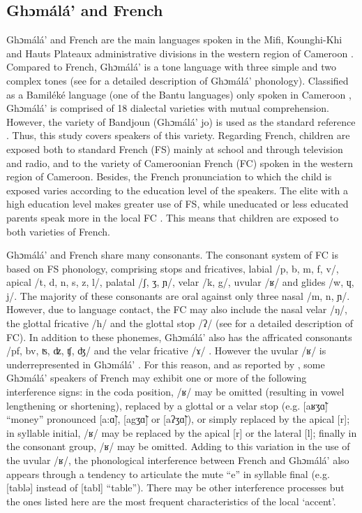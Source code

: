 \documentclass[output=paper,newtxmath,modfonts,nonflat,draftmode]{langsci/langscibook}
\begin{document}
\subsection{Ghɔmálá’ and French} %

Ghɔmálá’ and French are the main languages spoken in the Mifi, Kounghi-Khi and Hauts Plateaux administrative divisions in the western region of Cameroon \citep{Breton1991}. Compared to French, Ghɔmálá’ is a tone language with three simple and two complex tones (see \citet{Nissim1981} for a detailed description of Ghɔmálá’ phonology). Classified as a Bamiléké language (one of the Bantu languages) only spoken in Cameroon \citep{Dieu1983}, Ghɔmálá’ is comprised of 18 dialectal varieties with mutual comprehension. However, the variety of Bandjoun (Ghɔmálá’ jo) is used as the standard reference \citep{Domche1991}. Thus, this study covers speakers of this variety. Regarding French, children are exposed both to standard French (FS) mainly at school and through television and radio, and to the variety of Cameroonian French (FC) spoken in the western region of Cameroon. Besides, the French pronunciation to which the child is exposed varies according to the education level of the speakers. The elite with a high education level makes greater use of FS, while uneducated or less educated parents speak more in the local FC \citep{Biloa2004}. This means that children are exposed to both varieties of French. 

Ghɔmálá’ and French share many consonants. The consonant system of FC is based on FS phonology, comprising stops and fricatives, labial /p, b, m, f, v/, apical /t, d, n, s, z, l/, palatal /ʃ, ʒ, ɲ/, velar /k, g/, uvular /ʁ/ and glides /w, ɥ, j/. The majority of these consonants are oral against only three nasal /m, n, ɲ/. However, due to language contact, the FC may also include the nasal velar /ŋ/, the glottal fricative /h/ and the glottal stop /ʔ/ (see \citet{Biloa2004} for a detailed description of FC). In addition to these phonemes, Ghɔmálá’ also has the affricated consonants /pf, bv, ʦ, ʣ, ʧ, ʤ/ and the velar fricative /ɤ/ \citep{Mba1995}. However the uvular /ʁ/ is underrepresented in Ghɔmálá’ \citep{Mba1995}. For this reason, and as reported by \citet{Biloa2004}, some Ghɔmálá’ speakers of French may exhibit one or more of the following interference signs: in the coda position, /ʁ/ may be omitted (resulting in vowel lengthening or shortening), replaced by a glottal or a velar stop (e.g. [aʁʒɑ̃] “money” pronounced [a:ɑ̃], [agʒɑ̃] or [aʔʒɑ̃]), or simply replaced by the apical [r]; in syllable initial, /ʁ/ may be replaced by the apical [r] or the lateral [l]; finally in the consonant group, /ʁ/ may be omitted. Adding to this variation in the use of the uvular /ʁ/, the phonological interference between French and Ghɔmálá’ also appears through a tendency to articulate the mute “e” in syllable final (e.g. [tablə] instead of [tabl] “table”). There may be other interference processes but the ones listed here are the most frequent characteristics of the local ‘accent’. 
\end{document}
